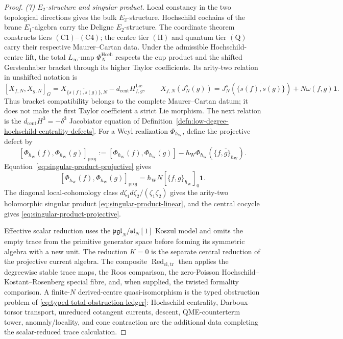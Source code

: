 \documentclass[11pt]{memoir}
\begin{document}
\begin{proof}
  \emph{(7) \(E_2\)-structure and singular product.}
  Local constancy in the two topological directions gives the bulk
  \(E_2\)-structure.  Hochschild cochains of the brane \(E_1\)-algebra
  carry the Deligne \(E_2\)-structure.  The coordinate theorem constructs
  tiers \(\mathrm{(C1)}\)--\(\mathrm{(C4)}\); the centre tier
  \(\mathrm{(H)}\) and quantum tier \(\mathrm{(Q)}\) carry their
  respective Maurer--Cartan data.  Under the admissible
  Hochschild-centre lift, the total \(L_\infty\)-map
  \(\Phi_N^{\mathrm{Hoch}}\) respects the cup product and the shifted
  Gerstenhaber bracket through its higher Taylor coefficients.  Its
  arity-two relation in unshifted notation is
  \[
    [X_{f,N},X_{g,N}]_G
      =X_{\overline{\{s(f),s(g)\}},N}
       -d_{\mathrm{cent}}H^{\mathrm{Lie}}_{f,g},
    \qquad
    X_{f,N}(J_N^s(g))
      =J_N^s\!\left(\overline{\{s(f),s(g)\}}\right)
       +N\omega(f,g)\mathbf1 .
  \]
  Thus bracket compatibility belongs to the complete
  Maurer--Cartan datum; it does not make the first Taylor coefficient a
  strict Lie morphism.  The next relation is the
  \(d_{\mathrm{cent}}H^3=-\delta^3\) Jacobiator equation of
  Definition~\ref{defn:low-degree-hochschild-centrality-defects}.
  For a Weyl realization \(\Phi_{\hbar_{\mathrm W}}\), define the
  projective defect by
  \[
    [\Phi_{\hbar_{\mathrm W}}(f),
      \Phi_{\hbar_{\mathrm W}}(g)]_{\mathrm{proj}}
    :=
    [\Phi_{\hbar_{\mathrm W}}(f),
      \Phi_{\hbar_{\mathrm W}}(g)]
    -\hbar_{\mathrm W}
      \Phi_{\hbar_{\mathrm W}}
      \!\left(\overline{\{f,g\}_{\hbar_{\mathrm W}}}\right).
  \]
  Equation~\eqref{eq:singular-product-projective} gives
  \[
    [\Phi_{\hbar_{\mathrm W}}(f),
      \Phi_{\hbar_{\mathrm W}}(g)]_{\mathrm{proj}}
    =\hbar_{\mathrm W}N
      [\{f,g\}_{\hbar_{\mathrm W}}]_0\mathbf1.
  \]
  The diagonal local-cohomology class
  \(d\zeta_1d\zeta_2/(\zeta_1\zeta_2)\) gives the arity-two
  holomorphic singular product \eqref{eq:singular-product-linear}, and the
  central cocycle gives \eqref{eq:singular-product-projective}.

  Effective scalar reduction uses the
  \(\mathfrak{pgl}_N/\mathfrak{sl}_N[1]\) Koszul model and omits the
  empty trace from the primitive generator space before forming its
  symmetric algebra with a new unit.  The reduction \(K=0\) is the
  separate central reduction of the projective current algebra.  The
  composite \(\operatorname{Red}_{\mathrm{cl,tr}}\) then applies the
  degreewise stable trace maps, the Roos comparison, the zero-Poisson
  Hochschild--Kostant--Rosenberg special fibre, and, when supplied, the
  twisted formality comparison.  A finite-\(N\) derived-centre
  quasi-isomorphism is the typed obstruction problem of
  \eqref{eq:typed-total-obstruction-ledger}: Hochschild centrality,
	  Darboux-torsor transport, unreduced cotangent currents, descent,
	  QME-counterterm tower, anomaly/locality, and cone contraction are the
  additional data completing the scalar-reduced trace calculation.
\end{proof}
\end{document}
